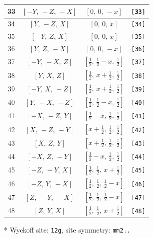 \documentclass[fleqn,8pt]{jsarticle}
\begin{document}
\begin{longtable}{cccc}
33 & $\left[ - Y,\, - Z,\, - X \right]$ & $\left[ 0,\, 0,\, - x \right]$ & {\tt [33]} \\ \hline
34 & $\left[ Y,\, - Z,\, X \right]$ & $\left[ 0,\, 0,\, x \right]$ & {\tt [34]} \\ \hline
35 & $\left[ - Y,\, Z,\, X \right]$ & $\left[ 0,\, 0,\, x \right]$ & {\tt [35]} \\ \hline
36 & $\left[ Y,\, Z,\, - X \right]$ & $\left[ 0,\, 0,\, - x \right]$ & {\tt [36]} \\ \hline
37 & $\left[ - Y,\, - X,\, Z \right]$ & $\left[ \frac{1}{2},\, \frac{1}{2} - x,\, \frac{1}{2} \right]$ & {\tt [37]} \\ \hline
38 & $\left[ Y,\, X,\, Z \right]$ & $\left[ \frac{1}{2},\, x + \frac{1}{2},\, \frac{1}{2} \right]$ & {\tt [38]} \\ \hline
39 & $\left[ - Y,\, X,\, - Z \right]$ & $\left[ \frac{1}{2},\, x + \frac{1}{2},\, \frac{1}{2} \right]$ & {\tt [39]} \\ \hline
40 & $\left[ Y,\, - X,\, - Z \right]$ & $\left[ \frac{1}{2},\, \frac{1}{2} - x,\, \frac{1}{2} \right]$ & {\tt [40]} \\ \hline
41 & $\left[ - X,\, - Z,\, Y \right]$ & $\left[ \frac{1}{2} - x,\, \frac{1}{2},\, \frac{1}{2} \right]$ & {\tt [41]} \\ \hline
42 & $\left[ X,\, - Z,\, - Y \right]$ & $\left[ x + \frac{1}{2},\, \frac{1}{2},\, \frac{1}{2} \right]$ & {\tt [42]} \\ \hline
43 & $\left[ X,\, Z,\, Y \right]$ & $\left[ x + \frac{1}{2},\, \frac{1}{2},\, \frac{1}{2} \right]$ & {\tt [43]} \\ \hline
44 & $\left[ - X,\, Z,\, - Y \right]$ & $\left[ \frac{1}{2} - x,\, \frac{1}{2},\, \frac{1}{2} \right]$ & {\tt [44]} \\ \hline
45 & $\left[ - Z,\, - Y,\, X \right]$ & $\left[ \frac{1}{2},\, \frac{1}{2},\, x + \frac{1}{2} \right]$ & {\tt [45]} \\ \hline
46 & $\left[ - Z,\, Y,\, - X \right]$ & $\left[ \frac{1}{2},\, \frac{1}{2},\, \frac{1}{2} - x \right]$ & {\tt [46]} \\ \hline
47 & $\left[ Z,\, - Y,\, - X \right]$ & $\left[ \frac{1}{2},\, \frac{1}{2},\, \frac{1}{2} - x \right]$ & {\tt [47]} \\ \hline
48 & $\left[ Z,\, Y,\, X \right]$ & $\left[ \frac{1}{2},\, \frac{1}{2},\, x + \frac{1}{2} \right]$ & {\tt [48]} \\
\end{longtable}
* Wyckoff site: {\tt 12g}, site symmetry: {\tt mm2..}
\end{document}
